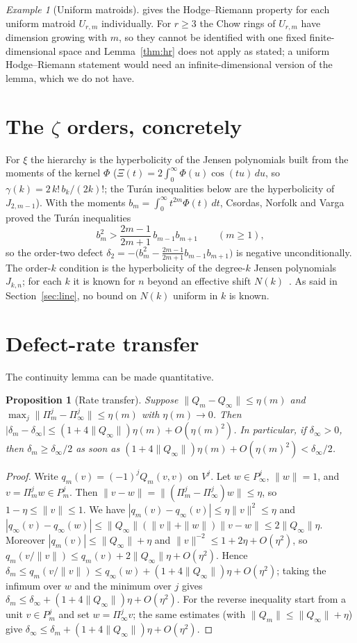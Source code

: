\documentclass[11pt]{amsart}
\newtheorem{proposition}[theorem]{Proposition}
\theoremstyle{definition}
\theoremstyle{remark}
\newtheorem{example}[theorem]{Example}
\begin{document}
\begin{example}[Uniform matroids]\label{ex:matroid}
\cite{AHK} gives the Hodge--Riemann property for each uniform matroid $U_{r,m}$
individually. For $r\ge3$ the Chow rings of $U_{r,m}$ have dimension growing with
$m$, so they cannot be identified with one fixed finite-dimensional space and
Lemma~\ref{thm:hr} does not apply as stated; a uniform Hodge--Riemann statement
would need an infinite-dimensional version of the lemma, which we do not have.
\end{example}

\section{The \texorpdfstring{$\zeta$}{zeta} orders, concretely}
For $\xi$ the hierarchy is the hyperbolicity of the Jensen polynomials built
from the moments of the kernel $\Phi$
($\Xi(t)=2\int_0^\infty\Phi(u)\cos(tu)\,du$, so $\gamma(k)=2\,k!\,b_k/(2k)!$;
the Tur\'an inequalities below are the hyperbolicity of $J_{2,m-1}$). With the moments
$b_m=\int_0^\infty t^{2m}\Phi(t)\,dt$, Csordas, Norfolk and Varga~\cite{CNV} proved
the Tur\'an inequalities
\[
b_m^2>\frac{2m-1}{2m+1}\,b_{m-1}b_{m+1}\qquad(m\ge1),
\]
so the order-two defect
$\delta_2=-\bigl(b_m^2-\tfrac{2m-1}{2m+1}b_{m-1}b_{m+1}\bigr)$ is negative
unconditionally. The order-$k$ condition is the hyperbolicity of the degree-$k$
Jensen polynomials $J_{k,n}$; for each $k$ it is known for $n$ beyond an effective
shift $N(k)$~\cite{GORZ}. As said in Section~\ref{sec:line}, no bound on $N(k)$
uniform in $k$ is known.

\section{Defect-rate transfer}
The continuity lemma can be made quantitative.
\begin{proposition}[Rate transfer]\label{prop:rate}
Suppose $\|Q_m-Q_\infty\|\le\eta(m)$ and $\max_j\|\Pi_m^j-\Pi_\infty^j\|\le\eta(m)$
with $\eta(m)\to0$. Then
$|\delta_m-\delta_\infty|\le(1+4\|Q_\infty\|)\eta(m)+O(\eta(m)^2)$. In particular,
if $\delta_\infty>0$, then $\delta_m\ge\delta_\infty/2$ as soon as
$(1+4\|Q_\infty\|)\eta(m)+O(\eta(m)^2)<\delta_\infty/2$.
\end{proposition}
\begin{proof}
Write $q_m(v)=(-1)^jQ_m(v,v)$ on $V^j$. Let $w\in P_\infty^j$, $\|w\|=1$, and
$v=\Pi_m^jw\in P_m^j$. Then $\|v-w\|=\|(\Pi_m^j-\Pi_\infty^j)w\|\le\eta$, so
$1-\eta\le\|v\|\le1$. We have $|q_m(v)-q_\infty(v)|\le\eta\|v\|^2\le\eta$ and
$|q_\infty(v)-q_\infty(w)|\le\|Q_\infty\|(\|v\|+\|w\|)\|v-w\|\le2\|Q_\infty\|\eta$.
Moreover $|q_m(v)|\le\|Q_\infty\|+\eta$ and $\|v\|^{-2}\le1+2\eta+O(\eta^2)$, so
$q_m(v/\|v\|)\le q_m(v)+2\|Q_\infty\|\eta+O(\eta^2)$. Hence
$\delta_m\le q_m(v/\|v\|)\le q_\infty(w)+(1+4\|Q_\infty\|)\eta+O(\eta^2)$; taking
the infimum over $w$ and the minimum over $j$ gives
$\delta_m\le\delta_\infty+(1+4\|Q_\infty\|)\eta+O(\eta^2)$. For the reverse
inequality start from a unit $v\in P_m^j$ and set $w=\Pi_\infty^jv$; the same
estimates (with $\|Q_m\|\le\|Q_\infty\|+\eta$) give
$\delta_\infty\le\delta_m+(1+4\|Q_\infty\|)\eta+O(\eta^2)$.
\end{proof}
\end{document}
